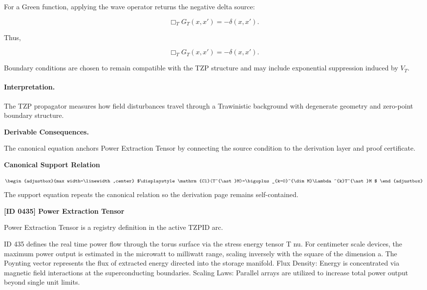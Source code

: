 For a Green function, applying the wave operator returns the negative delta source:

\begin{equation}
\Box_T G_T(x,x')
=
-\delta(x,x') .
\end{equation}

Thus,

\begin{equation}
\boxed{
\Box_T G_T(x,x')
=
-\delta(x,x') .
}
\end{equation}

Boundary conditions are chosen to remain compatible with the TZP structure and may include exponential suppression induced by $V_T$.

\paragraph{Interpretation.}
The TZP propagator measures how field disturbances travel through a Trawinistic background with degenerate geometry and zero-point boundary structure.

\par\vspace{0.35em}
\noindent\textbf{Derivable Consequences.}\quad
\begingroup
\footnotesize
\raggedright
The canonical equation anchors Power Extraction Tensor by connecting the source condition to the derivation layer and proof certificate.
\par\endgroup

\noindent\textbf{Canonical Support Relation}\par
\[
\begin{adjustbox}{max width=\linewidth,center}
$\displaystyle
\mathrm{Cl}(T^{\ast}M)=\bigoplus_{k=0}^{\dim M}\Lambda^{k}T^{\ast}M
$
\end{adjustbox}
\]
\noindent The support equation repeats the canonical relation so the derivation page remains self-contained.\par

\clearpage
\noindent\textbf{[ID 0435] Power Extraction Tensor}\par
\vspace{0.35em}
\begingroup\small
{}
Power Extraction Tensor is a registry definition in the active TZPID arc.

ID 435 defines the real time power flow through the torus surface via the stress energy tensor T nu. For centimeter scale devices, the maximum power output is estimated in the microwatt to milliwatt range, scaling inversely with the square of the dimension a. The Poynting vector represents the flux of extracted energy directed into the storage manifold. Flux Density: Energy is concentrated via magnetic field interactions at the superconducting boundaries. Scaling Laws: Parallel arrays are utilized to increase total power output beyond single unit limits.

